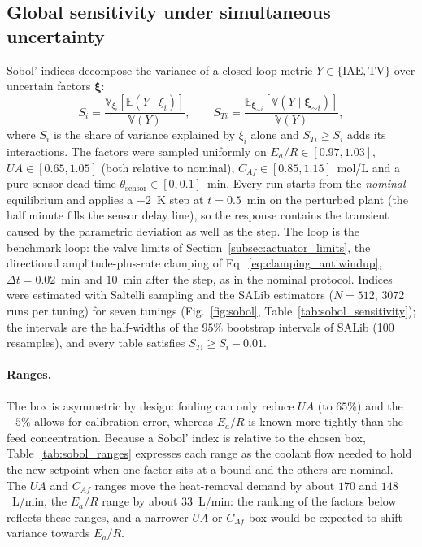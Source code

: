 \documentclass[11pt]{article}
\begin{document}
\subsection{Global sensitivity under simultaneous uncertainty}
\label{subsec:sobol_results}
Sobol' indices \cite{sobol2001global, saltelli2010variance} decompose the variance of a closed-loop metric $Y \in \{\mathrm{IAE}, \mathrm{TV}\}$ over uncertain factors $\boldsymbol{\xi}$:
\begin{equation}
    S_i = \frac{\mathbb{V}_{\xi_i}\!\left[\mathbb{E}(Y \mid \xi_i)\right]}{\mathbb{V}(Y)}, \qquad S_{Ti} = \frac{\mathbb{E}_{\boldsymbol{\xi}_{\sim i}}\!\left[\mathbb{V}(Y \mid \boldsymbol{\xi}_{\sim i})\right]}{\mathbb{V}(Y)},
    \label{eq:sobol}
\end{equation}
where $S_i$ is the share of variance explained by $\xi_i$ alone and $S_{Ti} \ge S_i$ adds its interactions. The factors were sampled uniformly on $E_a/R \in [0.97, 1.03]$, $UA \in [0.65, 1.05]$ (both relative to nominal), $C_{Af} \in [0.85, 1.15]$~mol/L and a pure sensor dead time $\theta_{\text{sensor}} \in [0, 0.1]$~min. Every run starts from the \emph{nominal} equilibrium and applies a $-2$~K step at $t = 0.5$~min on the perturbed plant (the half minute fills the sensor delay line), so the response contains the transient caused by the parametric deviation as well as the step. The loop is the benchmark loop: the valve limits of Section~\ref{subsec:actuator_limits}, the directional amplitude-plus-rate clamping of Eq.~\eqref{eq:clamping_antiwindup}, $\Delta t = 0.02$~min and $10$~min after the step, as in the nominal protocol. Indices were estimated with Saltelli sampling and the SALib estimators \cite{herman2017salib} ($N = 512$, $3072$ runs per tuning) for seven tunings (Fig.~\ref{fig:sobol}, Table~\ref{tab:sobol_sensitivity}); the intervals are the half-widths of the $95\%$ bootstrap intervals of SALib (100 resamples), and every table satisfies $S_{Ti} \ge S_i - 0.01$.

\paragraph{Ranges.} The box is asymmetric by design: fouling can only reduce $UA$ (to $65\%$) and the $+5\%$ allows for calibration error, whereas $E_a/R$ is known more tightly than the feed concentration. Because a Sobol' index is relative to the chosen box, Table~\ref{tab:sobol_ranges} expresses each range as the coolant flow needed to hold the new setpoint when one factor sits at a bound and the others are nominal. The $UA$ and $C_{Af}$ ranges move the heat-removal demand by about $170$ and $148$~L/min, the $E_a/R$ range by about $33$~L/min: the ranking of the factors below reflects these ranges, and a narrower $UA$ or $C_{Af}$ box would be expected to shift variance towards $E_a/R$.
\end{document}
